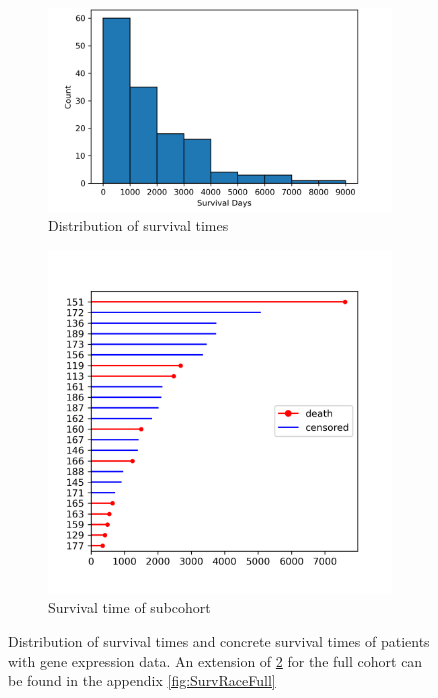 \begin{figure}[htb]
    \centering
 \begin{subfigure}[b]{0.59\textwidth}
 \centering
    \includegraphics[width=\textwidth]{latex/figures/survival_days_distribution_hires_evenly_binned.png}
     \caption{Distribution of survival times}
     \label{fig:SurvHisto}
 \end{subfigure}
    \hfill
 \begin{subfigure}[b]{0.4\textwidth}
 \centering
     \includegraphics[width=\textwidth]{latex/figures/surv_race_rcc.png}
     \caption{Survival time of subcohort}
     \label{fig:SurvRaceSmall}
 \end{subfigure}
  \caption[Cohort visualisation]{Distribution of survival times and concrete survival times of patients with gene expression data. An extension of \ref{fig:SurvRaceSmall} for the full cohort can be found in the appendix \ref{fig:SurvRaceFull}}
  \label{fig:SurvStats}
\end{figure}


